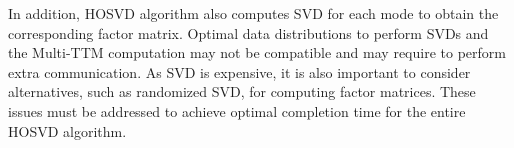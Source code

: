 \documentclass[a4paper,11pt, margin=2cm]{article}
\begin{document}
	In addition, HOSVD algorithm also computes SVD for each mode to obtain the corresponding factor matrix. Optimal data distributions to perform SVDs and the Multi-TTM computation may not be compatible and may require to perform extra communication. As SVD is expensive, it is also important to consider alternatives, such as randomized SVD, for computing factor matrices. These issues must be addressed to achieve optimal completion time for the entire HOSVD algorithm.
	
	
	
	
	
	
	
	
\end{document}
